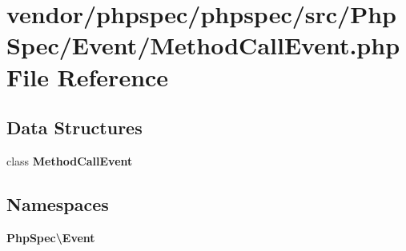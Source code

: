 \section{vendor/phpspec/phpspec/src/\+Php\+Spec/\+Event/\+Method\+Call\+Event.php File Reference}
\label{_method_call_event_8php}
\subsection*{Data Structures}
\begin{DoxyCompactItemize}
\item 
class {\bf Method\+Call\+Event}
\end{DoxyCompactItemize}
\subsection*{Namespaces}
\begin{DoxyCompactItemize}
\item 
 {\bf Php\+Spec\textbackslash{}\+Event}
\end{DoxyCompactItemize}
